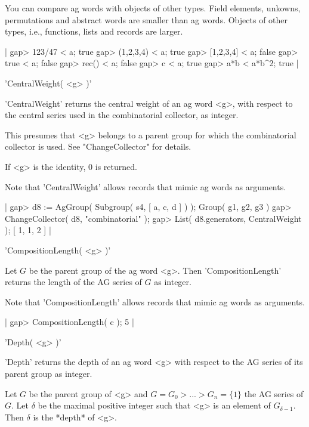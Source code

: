 You  can  compare  ag words with objects of other types.  Field elements,
unkowns, permutations and abstract  words  are  smaller  than  ag  words.
Objects of other types, i.e., functions, lists and records are larger.

|    gap> 123/47 < a;
    true
    gap> (1,2,3,4) < a;
    true
    gap> [1,2,3,4] < a;
    false
    gap> true < a;
    false
    gap> rec() < a;
    false
    gap> c < a;
    true
    gap> a*b < a*b^2;
    true |


'CentralWeight( <g> )'

'CentralWeight'  returns  the central  weight  of an  ag  word  <g>, with
respect to the central  series used  in  the combinatorial  collector, as
integer.

This presumes  that  <g>  belongs  to   a parent  group   for   which the
combinatorial collector is used. See "ChangeCollector" for details.

If <g> is the identity, 0 is returned.

Note that   'CentralWeight'   allows  records  that mimic   ag  words  as
arguments.

|    gap> d8 := AgGroup( Subgroup( s4, [ a, c, d ] ) );
    Group( g1, g2, g3 )
    gap> ChangeCollector( d8, "combinatorial" );
    gap> List( d8.generators, CentralWeight );
    [ 1, 1, 2 ] |


'CompositionLength( <g> )'

Let $G$ be the parent group of the ag word <g>.  Then 'CompositionLength'
returns the length of the AG series of $G$ as integer.

Note  that 'CompositionLength' allows records  that mimic   ag  words  as
arguments.

|    gap> CompositionLength( c );
    5 |


'Depth( <g> )'

'Depth' returns the depth of an ag word <g> with respect to the AG series
of its parent group as integer.

Let $G$ be the parent  group of <g> and  $G=G_0  > ...  > G_n=\{1\}$  the
AG series of $G$.  Let $\delta$ be the maximal positive integer such that
<g> is an element of $G_{\delta-1}$. Then $\delta$ is the *depth* of <g>.

